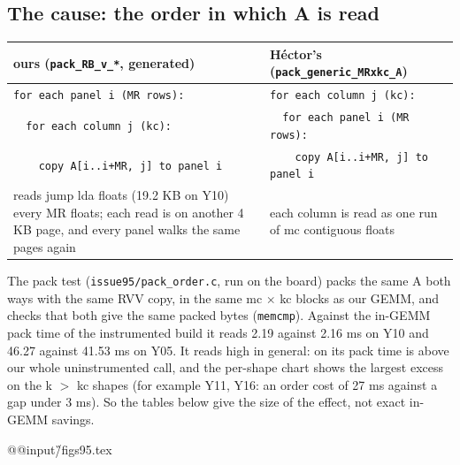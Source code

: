 \subsection{The cause: the order in which A is read}\label{sec:95cause}
\begin{center}\small
\begin{tabular}{@{}p{7.6cm} p{7.6cm}@{}}
\toprule
ours (\texttt{pack\_RB\_v\_*}, generated) & H\'ector's (\texttt{pack\_generic\_MRxkc\_A}) \\
\midrule
\texttt{for each panel i (MR rows):} & \texttt{for each column j (kc):} \\
\texttt{\ \ for each column j (kc):} & \texttt{\ \ for each panel i (MR rows):} \\
\texttt{\ \ \ \ copy A[i..i+MR, j] to panel i} & \texttt{\ \ \ \ copy A[i..i+MR, j] to panel i} \\
\midrule
reads jump lda floats (19.2 KB on Y10) every MR floats; each read is on another 4 KB page, and every panel walks the same pages again & each column is read as one run of mc contiguous floats \\
\bottomrule
\end{tabular}
\end{center}
The pack test (\texttt{issue95/pack\_order.c}, run on the board) packs the same A both ways with the same RVV copy, in the same mc $\times$ kc blocks as our GEMM, and checks that both give the same packed bytes (\texttt{memcmp}). Against the in-GEMM pack time of the instrumented build it reads 2.19 against 2.16 ms on Y10 and 46.27 against 41.53 ms on Y05. It reads high in general: on  its pack time is above our whole uninstrumented call, and the per-shape chart shows the largest excess on the k $>$ kc shapes (for example Y11, Y16: an order cost of 27 ms against a gap under 3 ms). So the tables below give the size of the effect, not exact in-GEMM savings.

\csname @@input\endcsname \G/figs95.tex

